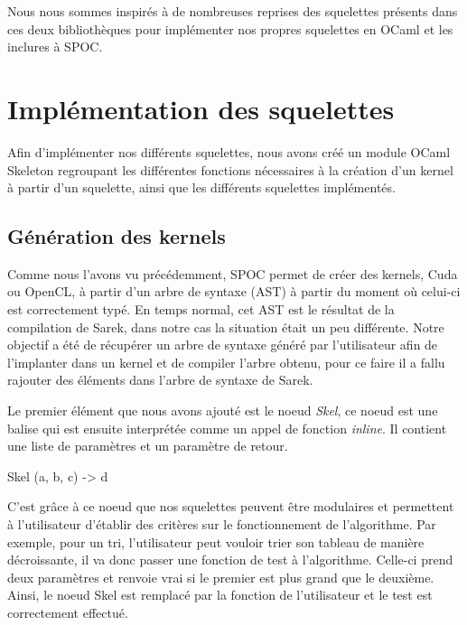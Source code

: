 \documentclass{report}
\begin{document}
\begin{itemize}
Nous nous sommes inspirés à de nombreuses reprises des squelettes présents dans ces deux bibliothèques pour implémenter nos propres squelettes en OCaml et les inclures à SPOC. 

\section{Implémentation des squelettes}
Afin d'implémenter nos différents squelettes, nous avons créé un module OCaml Skeleton regroupant les différentes fonctions nécessaires à la création d'un kernel à partir d'un squelette, ainsi que les différents squelettes implémentés. 

\subsection{Génération des kernels}
Comme nous l'avons vu précédemment, SPOC permet de créer des kernels, Cuda ou OpenCL, à partir d'un arbre de syntaxe (AST) à partir du moment où celui-ci est correctement typé. En temps normal, cet AST est le résultat de la compilation de Sarek, dans notre cas la situation était un peu différente. Notre objectif a été de récupérer un arbre de syntaxe généré par l'utilisateur afin de l'implanter dans un kernel et de compiler l'arbre obtenu, pour ce faire il a fallu rajouter des éléments dans l'arbre de syntaxe de Sarek.\newline

Le premier élément que nous avons ajouté est le noeud \textit{Skel}, ce noeud est une balise qui est ensuite interprétée comme un appel de fonction \textit{inline}. Il contient une liste de paramètres et un paramètre de retour. \newline

\begin{verbatimtab}
Skel (a, b, c) -> d
\end{verbatimtab}

C'est grâce à ce noeud que nos squelettes peuvent être modulaires et permettent à l'utilisateur d'établir des critères sur le fonctionnement de l'algorithme. Par exemple, pour un tri, l'utilisateur peut vouloir trier son tableau de manière décroissante, il va donc passer une fonction de test à l'algorithme. Celle-ci prend deux paramètres et renvoie vrai si le premier est plus grand que le deuxième. Ainsi, le noeud Skel est remplacé par la fonction de l'utilisateur et le test est correctement effectué. 


\end{itemize}
\end{document}
